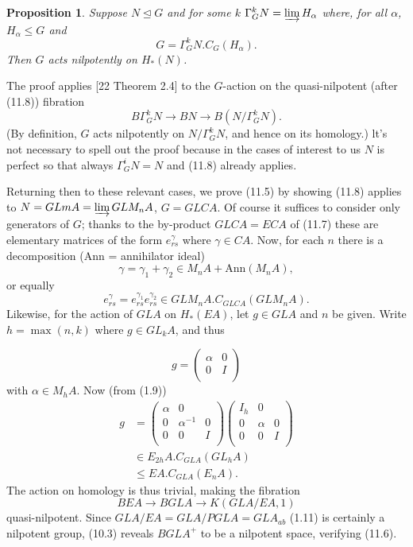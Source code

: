 \documentclass[openany,leqno]{book}  %
\newtheorem{prop}[theorem]{Proposition}
\begin{document}
\begin{prop}
	Suppose $N\unlhd G$ and for some $k$ $\Gamma_G^k N = \varinjlim H_\alpha$ where, for all $\alpha$, $H_\alpha\leqslant G$ and
\[G = \Gamma_G^k N . C_G(H_\alpha).\]
Then $G$ acts nilpotently on $H_*(N)$.
\end{prop}

The proof applies [22 Theorem 2.4] to the $G$-action on the quasi-nilpotent (after (11.8)) fibration
\[B\Gamma_G^k N\longrightarrow BN \longrightarrow B(N/\Gamma_G^k N).\]
(By definition, $G$ acts nilpotently on $N/\Gamma_G^k N$, and hence on its homology.) lt's not necessary to spell out the proof because in the cases of interest to us $N$ is perfect so that always $\Gamma_G^i N = N$ and (11.8) already applies.

Returning then to these relevant cases, we prove (11.5) by showing (11.8) applies to
$N = GLmA = \varinjlim GLM_nA$, $G = GLCA$. Of course it suffices to consider only generators of $G$; thanks to the by-product $GLCA= ECA$ of (11.7) these are elementary matrices of the form $e_{rs}^\gamma$ where $\gamma \in CA$. Now, for each $n$ there is a decomposition ($\mathrm{Ann}$ = annihilator ideal)
\[\gamma= \gamma_1+ \gamma_2 \in M_nA + \mathrm{Ann}(M_nA),\]
or equally
\[e_{rs}^{\gamma} = e_{rs}^{\gamma_1}e_{rs}^{\gamma_2}\in GLM_nA.C_{GLCA}(GLM_nA). \]
Likewise, for the action of $GLA$ on $H_*(EA)$, let $g \in GLA$ and $n$ be given. Write $h = \max (n, k)$ where $g \in GL_kA$, and thus 

\[g=\begin{pmatrix}
  \alpha & 0\\
  0 & I\\
\end{pmatrix}\]
with $\alpha \in M_h A$. Now (from (1.9))
\begin{align*}
  g &=\begin{pmatrix}
  \alpha & 0 & \\
  0 &\alpha^{-1} & 0\\
  0 &0& I\\
\end{pmatrix}\begin{pmatrix}
  I_h& 0 & \\
  0 &\alpha & 0\\
  0 &0& I\\
\end{pmatrix} \\
& \in E_{2h}A.C_{GLA}(GL_hA)\\
&  \leqslant EA.C_{GLA}(E_nA).
\end{align*}
The action on homology is thus trivial, making the fibration 
$$BEA \longrightarrow BGLA \longrightarrow K(GLA/EA, 1)$$
quasi-nilpotent. Since $GLA/EA = GLA/PGLA =GLA_{ab}$ (1.11) is certainly a nilpotent group,
(10.3) reveals $BGLA^+$ to be a nilpotent space, verifying (11.6).
\end{document}
